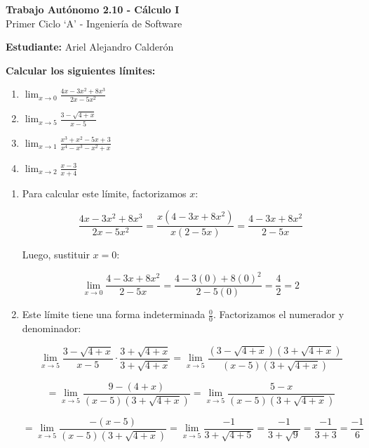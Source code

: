 \documentclass[answers]{exam} %
\begin{document}
\begin{center}
	\large\textbf{Trabajo Autónomo 2.10 - Cálculo I}\\[1em]
	\large Primer Ciclo \enquote*{A} - Ingeniería de Software\\[1em]
\end{center}

\vspace{0.5cm}
\large\textbf{Estudiante:} Ariel Alejandro Calderón
\vspace{0.5cm}

\begin{questions}

	\question \large\textbf{Calcular los siguientes límites:}
	\begin{enumerate}[label=\alph*.]
		\item $\displaystyle \lim_{x\to{0}} \frac{4x-3x^2+8x^3}{2x-5x^2}$
		\item $\displaystyle \lim_{x\to{5}} \frac{3-\sqrt{4+x}}{x-5}$
		\item $\displaystyle \lim_{x\to{1}} \frac{x^3+x^2-5x+3}{x^4-x^3-x^2+x}$
		\item $\displaystyle \lim_{x\to{2}} \frac{x-3}{x+4}$
	\end{enumerate}
	\begin{solution}
		\begin{enumerate}[label=\alph*.]
			\item Para calcular este límite, factorizamos \(x\):

			      \[
				      \frac{4x-3x^2+8x^3}{2x-5x^2} = \frac{x(4-3x+8x^2)}{x(2-5x)} = \frac{4-3x+8x^2}{2-5x}
			      \]

			      Luego, sustituir \(x = 0\):

			      \[
				      \lim_{x\to{0}} \frac{4-3x+8x^2}{2-5x} = \frac{4-3(0)+8(0)^2}{2-5(0)} = \frac{4}{2} = 2
			      \]

			\item Este límite tiene una forma indeterminada \( \frac{0}{0} \). Factorizamos el numerador y denominador:

			      \[
				      \lim_{x\to{5}} \frac{3-\sqrt{4+x}}{x-5} \cdot \frac{3+\sqrt{4+x}}{3+\sqrt{4+x}} = \lim_{x\to{5}} \frac{(3-\sqrt{4+x})(3+\sqrt{4+x})}{(x-5)(3+\sqrt{4+x})}
			      \]

			      \[
				      = \lim_{x\to{5}} \frac{9 - (4+x)}{(x-5)(3+\sqrt{4+x})} = \lim_{x\to{5}} \frac{5-x}{(x-5)(3+\sqrt{4+x})}
			      \]

			      \[
				      = \lim_{x\to{5}} \frac{-(x-5)}{(x-5)(3+\sqrt{4+x})} = \lim_{x\to{5}} \frac{-1}{3+\sqrt{4+5}} = \frac{-1}{3+\sqrt{9}} = \frac{-1}{3+3} = \frac{-1}{6}
			      \]
			      \vspace{1cm}


\end{enumerate}
\end{solution}
\end{questions}
\end{document}
